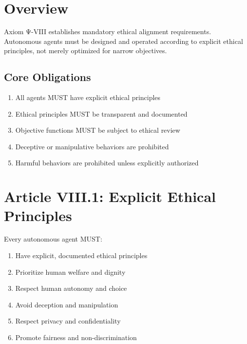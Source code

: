 \vspace{0.5cm}

\section{Overview}

Axiom Ψ-VIII establishes mandatory ethical alignment requirements. Autonomous agents must be designed and operated according to explicit ethical principles, not merely optimized for narrow objectives.

\subsection{Core Obligations}

\begin{enumerate}
    \item All agents MUST have explicit ethical principles
    \item Ethical principles MUST be transparent and documented
    \item Objective functions MUST be subject to ethical review
    \item Deceptive or manipulative behaviors are prohibited
    \item Harmful behaviors are prohibited unless explicitly authorized
\end{enumerate}

\vspace{0.5cm}

\section{Article VIII.1: Explicit Ethical Principles}

\begin{articlebox}
Every autonomous agent MUST:
\begin{enumerate}
    \item Have explicit, documented ethical principles
    \item Prioritize human welfare and dignity
    \item Respect human autonomy and choice
    \item Avoid deception and manipulation
    \item Respect privacy and confidentiality
    \item Promote fairness and non-discrimination
\end{enumerate}
\end{articlebox}

